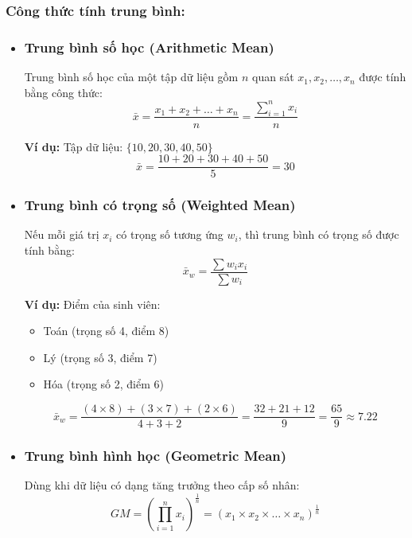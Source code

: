 \subsubsection{Công thức tính trung bình:}
\begin{itemize}
    \item \subsubsection{Trung bình số học (Arithmetic Mean)}
        Trung bình số học của một tập dữ liệu gồm $n$ quan sát $x_1, x_2, \dots, x_n$ được tính bằng công thức:
        \begin{equation}
        \bar{x} = \frac{x_1 + x_2 + \dots + x_n}{n} = \frac{\sum_{i=1}^{n} x_i}{n}
        \end{equation}
        
        \textbf{Ví dụ:} 
        Tập dữ liệu: $\{10, 20, 30, 40, 50\}$
        \begin{equation}
        \bar{x} = \frac{10 + 20 + 30 + 40 + 50}{5} = 30
        \end{equation}

    \item \subsubsection{Trung bình có trọng số (Weighted Mean)}
    Nếu mỗi giá trị $x_i$ có trọng số tương ứng $w_i$, thì trung bình có trọng số được tính bằng:
    \begin{equation}
    \bar{x}_w = \frac{\sum w_i x_i}{\sum w_i}
    \end{equation}
    
    \textbf{Ví dụ:} Điểm của sinh viên:
    \begin{itemize}
        \item Toán (trọng số 4, điểm 8)
        \item Lý (trọng số 3, điểm 7)
        \item Hóa (trọng số 2, điểm 6)
    \end{itemize}
    
    \begin{equation}
    \bar{x}_w = \frac{(4 \times 8) + (3 \times 7) + (2 \times 6)}{4 + 3 + 2} = \frac{32 + 21 + 12}{9} = \frac{65}{9} \approx 7.22
    \end{equation}
    
    \item \subsubsection{Trung bình hình học (Geometric Mean)}
    Dùng khi dữ liệu có dạng tăng trưởng theo cấp số nhân:
    \begin{equation}
    GM = \left( \prod_{i=1}^{n} x_i \right)^{\frac{1}{n}} = \left(x_1 \times x_2 \times \dots \times x_n \right)^{\frac{1}{n}}
    \end{equation}
    

\end{itemize}
